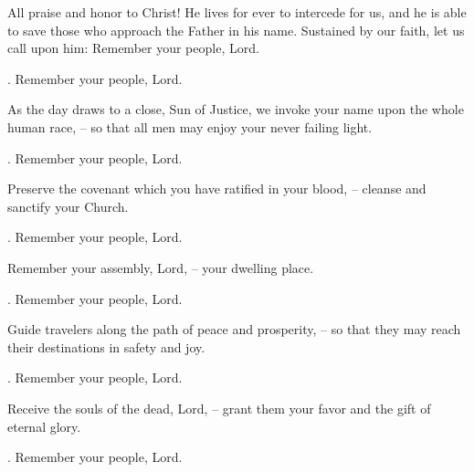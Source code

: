 \lettrine[lines=2]{A}{}ll praise and honor to Christ! He lives for ever to intercede for us, and he is able to save those who approach the Father in his name. Sustained by our faith, let us call upon him:
Remember your people, Lord.

\par \Rbar. Remember your people, Lord.

As the day draws to a close, Sun of Justice, we invoke your name upon the whole human race,
– so that all men may enjoy your never failing light.

\par \Rbar. Remember your people, Lord.

Preserve the covenant which you have ratified in your blood,
– cleanse and sanctify your Church.
\par \Rbar. Remember your people, Lord.

Remember your assembly, Lord,
– your dwelling place.
\par \Rbar. Remember your people, Lord.

Guide travelers along the path of peace and prosperity,
– so that they may reach their destinations in safety and joy.
\par \Rbar. Remember your people, Lord.

Receive the souls of the dead, Lord,
– grant them your favor and the gift of eternal glory.
\par \Rbar. Remember your people, Lord.
